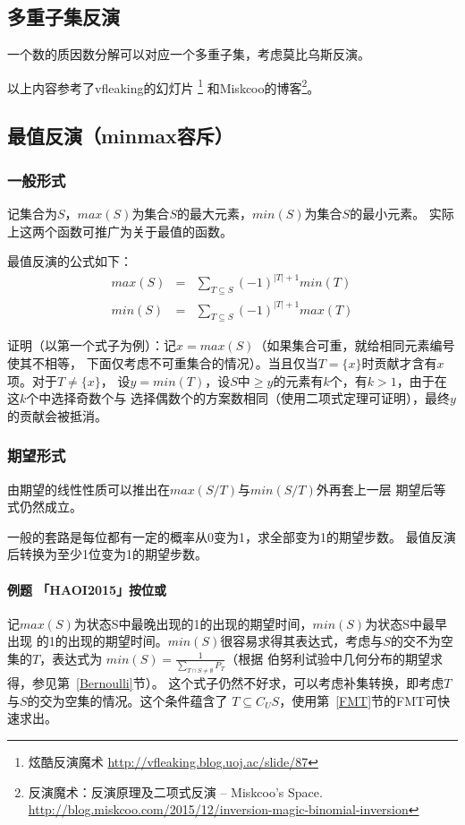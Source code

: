 \subsection{多重子集反演}
一个数的质因数分解可以对应一个多重子集，考虑莫比乌斯反演。

以上内容参考了vfleaking的幻灯片
\footnote{炫酷反演魔术 \url{http://vfleaking.blog.uoj.ac/slide/87}}
和Miskcoo的博客\footnote{反演魔术：反演原理及二项式反演 – Miskcoo's Space.
	\url{http://blog.miskcoo.com/2015/12/inversion-magic-binomial-inversion}
}。
\subsection{最值反演（minmax容斥）}
\subsubsection{一般形式}
记集合为$S$，$max(S)$为集合$S$的最大元素，$min(S)$为集合$S$的最小元素。
实际上这两个函数可推广为关于最值的函数。

最值反演的公式如下：
\begin{eqnarray*}
	max(S)&=&\sum_{T\subseteq S}{(-1)^{|T|+1}min(T)}\\
	min(S)&=&\sum_{T\subseteq S}{(-1)^{|T|+1}max(T)}
\end{eqnarray*}

证明（以第一个式子为例）：记$x=max(S)$（如果集合可重，就给相同元素编号使其不相等，
下面仅考虑不可重集合的情况）。当且仅当$T=\{x\}$时贡献才含有$x$项。对于$T\neq \{x\}$，
设$y=min(T)$，设$S$中$\geq y$的元素有$k$个，有$k>1$，由于在这$k$个中选择奇数个与
选择偶数个的方案数相同（使用二项式定理可证明），最终$y$的贡献会被抵消。

\subsubsection{期望形式}
由期望的线性性质可以推出在$max(S/T)$与$min(S/T)$外再套上一层
期望后等式仍然成立。

一般的套路是每位都有一定的概率从0变为1，求全部变为1的期望步数。
最值反演后转换为至少1位变为1的期望步数。

\paragraph{例题 「HAOI2015」按位或}
记$max(S)$为状态S中最晚出现的1的出现的期望时间，$min(S)$为状态S中最早出现
的1的出现的期望时间。$min(S)$很容易求得其表达式，考虑与$S$的交不为空集的$T$，表达式为
$min(S)=\frac{1}{\displaystyle \sum_{T\cap S \neq \emptyset}{P_T}}$（根据
伯努利试验中几何分布的期望求得，参见第~\ref{Bernoulli}节）。
这个式子仍然不好求，可以考虑补集转换，即考虑$T$与$S$的交为空集的情况。这个条件蕴含了
$T\subseteq C_US$，使用第~\ref{FMT}节的FMT可快速求出。

